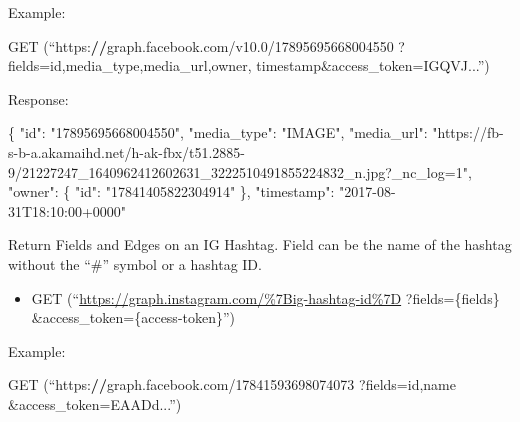 \documentclass[
]{book}
\newenvironment{Shaded}{\begin{snugshade}}{\end{snugshade}}
\newcommand{\AttributeTok}[1]{\textcolor[rgb]{0.77,0.63,0.00}{#1}}
\newcommand{\DecValTok}[1]{\textcolor[rgb]{0.00,0.00,0.81}{#1}}
\newcommand{\ErrorTok}[1]{\textcolor[rgb]{0.64,0.00,0.00}{\textbf{#1}}}
\newcommand{\FloatTok}[1]{\textcolor[rgb]{0.00,0.00,0.81}{#1}}
\newcommand{\FunctionTok}[1]{\textcolor[rgb]{0.00,0.00,0.00}{#1}}
\newcommand{\NormalTok}[1]{#1}
\newcommand{\SpecialCharTok}[1]{\textcolor[rgb]{0.00,0.00,0.00}{#1}}
\newcommand{\StringTok}[1]{\textcolor[rgb]{0.31,0.60,0.02}{#1}}
\providecommand{\tightlist}{%
  \setlength{\itemsep}{0pt}\setlength{\parskip}{0pt}}
\begin{document}
Example:

\begin{Shaded}
\begin{Highlighting}[]
\FunctionTok{GET}\NormalTok{ (“https}\SpecialCharTok{:}\ErrorTok{//}\NormalTok{graph.facebook.com}\SpecialCharTok{/}\NormalTok{v10}\FloatTok{.0}\SpecialCharTok{/}\DecValTok{17895695668004550}
\NormalTok{      ?}\AttributeTok{fields=}\NormalTok{id,media\_type,media\_url,owner,}
\NormalTok{      timestamp}\SpecialCharTok{\&}\AttributeTok{access\_token=}\NormalTok{IGQVJ...”)}
\end{Highlighting}
\end{Shaded}

Response:

\begin{Shaded}
\begin{Highlighting}[]
\NormalTok{\{}
  \StringTok{"id"}\SpecialCharTok{:} \StringTok{"17895695668004550"}\NormalTok{,}
  \StringTok{"media\_type"}\SpecialCharTok{:} \StringTok{"IMAGE"}\NormalTok{,}
  \StringTok{"media\_url"}\SpecialCharTok{:} \StringTok{"https://fb{-}s{-}b{-}a.akamaihd.net/h{-}ak{-}fbx/t51.2885{-}9/21227247\_1640962412602631\_3222510491855224832\_n.jpg?\_nc\_log=1"}\NormalTok{,}
  \StringTok{"owner"}\SpecialCharTok{:}\NormalTok{ \{}
    \StringTok{"id"}\SpecialCharTok{:} \StringTok{"17841405822304914"}
\NormalTok{  \},}
  \StringTok{"timestamp"}\SpecialCharTok{:} \StringTok{"2017{-}08{-}31T18:10:00+0000"}
\end{Highlighting}
\end{Shaded}

Return Fields and Edges on an IG Hashtag. Field can be the name of the hashtag without the ``\#'' symbol or a hashtag ID.

\begin{itemize}
\tightlist
\item
  GET (``\url{https://graph.instagram.com/\%7Big-hashtag-id\%7D}
  ?fields=\{fields\}
  \&access\_token=\{access-token\}'')
\end{itemize}

Example:

\begin{Shaded}
\begin{Highlighting}[]
\FunctionTok{GET}\NormalTok{ (“https}\SpecialCharTok{:}\ErrorTok{//}\NormalTok{graph.facebook.com}\SpecialCharTok{/}\DecValTok{17841593698074073}
\NormalTok{?}\AttributeTok{fields=}\NormalTok{id,name}
\SpecialCharTok{\&}\AttributeTok{access\_token=}\NormalTok{EAADd...”)}
\end{Highlighting}
\end{Shaded}
\end{document}
